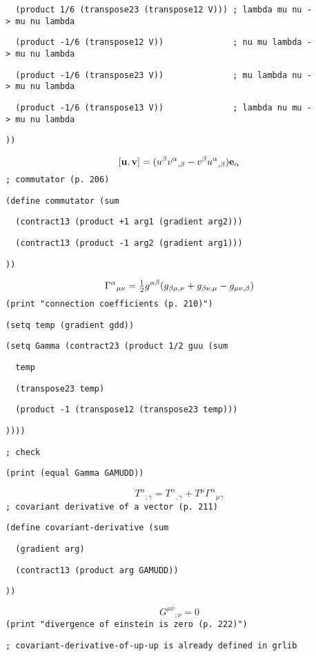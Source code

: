 {\tt \ \ (product\ 1/6\ (transpose23\ (transpose12\ V)))\ ;\ lambda\ mu\ nu\ ->\ mu\ nu\ lambda}

{\tt \ \ (product\ -1/6\ (transpose12\ V))\ \ \ \ \ \ \ \ \ \ \ \ \ \ ;\ nu\ mu\ lambda\ ->\ mu\ nu\ lambda}

{\tt \ \ (product\ -1/6\ (transpose23\ V))\ \ \ \ \ \ \ \ \ \ \ \ \ \ ;\ mu\ lambda\ nu\ ->\ mu\ nu\ lambda}

{\tt \ \ (product\ -1/6\ (transpose13\ V))\ \ \ \ \ \ \ \ \ \ \ \ \ \ ;\ lambda\ nu\ mu\ ->\ mu\ nu\ lambda}

{\tt ))}

$$[{\bf u},{\bf v}]=
(u^\beta{v^\alpha}_{,\beta}-v^\beta{u^\alpha}_{,\beta}){\bf e}_\alpha$$
{\tt ;\ commutator\ (p.\ 206)}

{\tt (define\ commutator\ (sum}

{\tt \ \ (contract13\ (product\ +1\ arg1\ (gradient\ arg2)))}

{\tt \ \ (contract13\ (product\ -1\ arg2\ (gradient\ arg1)))}

{\tt ))}

$${\Gamma^\alpha}_{\mu\nu}=\hbox{$1\over2$}g^{\alpha\beta}
(g_{\beta\mu,\nu}+g_{\beta\nu,\mu}-g_{\mu\nu,\beta})$$
{\tt (print\ "connection\ coefficients\ (p.\ 210)")}

{\tt (setq\ temp\ (gradient\ gdd))}

{\tt (setq\ Gamma\ (contract23\ (product\ 1/2\ guu\ (sum}

{\tt \ \ temp}

{\tt \ \ (transpose23\ temp)}

{\tt \ \ (product\ -1\ (transpose12\ (transpose23\ temp)))}

{\tt ))))}

{\tt ;\ check}

{\tt (print\ (equal\ Gamma\ GAMUDD))}

$${T^\alpha}_{;\gamma}={T^\alpha}_{,\gamma}+
T^\mu{\Gamma^\alpha}_{\mu\gamma}$$
{\tt ;\ covariant\ derivative\ of\ a\ vector\ (p.\ 211)}

{\tt (define\ covariant-derivative\ (sum}

{\tt \ \ (gradient\ arg)}

{\tt \ \ (contract13\ (product\ arg\ GAMUDD))}

{\tt ))}

$${G^{\mu\nu}}_{;\nu}=0$$
{\tt (print\ "divergence\ of\ einstein\ is\ zero\ (p.\ 222)")}

{\tt ;\ covariant-derivative-of-up-up\ is\ already\ defined\ in\ grlib}

